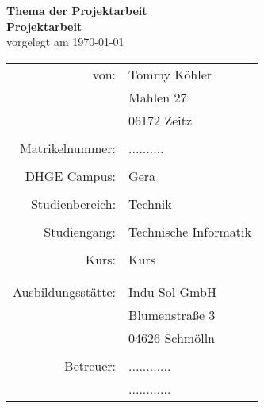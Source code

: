 \documentclass[a4paper,12pt]{scrartcl}
\begin{document}
\begin{center}
	{\LARGE \textbf{Thema der Projektarbeit}}\\
	\vspace{2.0cm}				%
	{\Huge \textbf{Projektarbeit}}\\
	\vspace{1.0cm}
	vorgelegt am \today\\
	\vspace{2.0cm}
	
\begin{tabular}{rl}
	von:				& Tommy Köhler\\
						& Mahlen 27\\
						& 06172 Zeitz\\
						& \\
	Matrikelnummer: 	& ..........\\
						& \\
	DHGE Campus:		& Gera\\
						& \\
	Studienbereich:		& Technik\\
						& \\
	Studiengang:		& Technische Informatik\\
						& \\
	Kurs:				& Kurs\\
						& \\
						& \\
	Ausbildungsstätte:	& Indu-Sol GmbH\\
						& Blumenstraße 3\\
						& 04626 Schmölln\\
						& \\
	Betreuer:			& ............ \\
						& ............ \\
						
						
\end{tabular}
\end{center}
\end{document}
